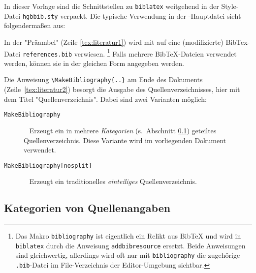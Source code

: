 In dieser Vorlage sind die Schnittstellen zu \texttt{biblatex} weitgehend in der Style-Datei 
\nolinkurl{hgbbib.sty} verpackt. Die typische Verwendung in der \latex-Haupt\-datei sieht 
folgendermaßen aus:
%
%
In der "Präambel" (Zeile \ref{tex:literatur1}) wird mit \verb!! 
auf eine (modifizierte) BibTex-Datei \nolinkurl{references.bib} verwiesen.%
\footnote{Das Makro 
\texttt{{\bs}bibliography} ist eigentlich ein Relikt aus BibTeX
und wird in \texttt{biblatex} durch die Anweisung \texttt{{\bs}addbibresource} 
ersetzt. Beide Anweisungen sind gleichwertig, allerdings wird oft nur mit 
\texttt{{\bs}bibliography} die zugehörige \texttt{.bib}-Datei im File-Verzeichnis 
der Editor-Umgebung sichtbar.}
Falls mehrere BibTeX-Dateien verwendet werden, können sie in der gleichen Form angegeben werden.

Die Anweisung \verb!! am Ende des Dokuments (Zeile~\ref{tex:literatur2})
besorgt die Ausgabe des Quellenverzeichnisses, hier mit dem Titel "Quellenverzeichnis".
Dabei sind zwei Varianten möglich:
%
\begin{description}
\item[\texttt{{\bs}MakeBibliography}] ~ \newline
   Erzeugt ein in mehrere \emph{Kategorien} (s.\ Abschnitt \ref{sec:BibKategorien}) geteiltes Quellenverzeichnis. 
	 Diese Variante wird im vorliegenden Dokument verwendet.
\item[\texttt{{\bs}MakeBibliography[nosplit]}] ~ \newline
   Erzeugt ein traditionelles \emph{einteiliges} Quellenverzeichnis. 
\end{description}


\subsection{Kategorien von Quellenangaben}
\label{sec:BibKategorien}

